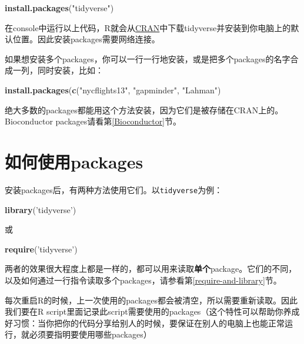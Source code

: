 \documentclass[]{book}
\newenvironment{Shaded}{\begin{snugshade}}{\end{snugshade}}
\newcommand{\KeywordTok}[1]{\textcolor[rgb]{0.13,0.29,0.53}{\textbf{#1}}}
\newcommand{\NormalTok}[1]{#1}
\newcommand{\StringTok}[1]{\textcolor[rgb]{0.31,0.60,0.02}{#1}}
\begin{document}
\begin{Shaded}
\begin{Highlighting}[]
\KeywordTok{install.packages}\NormalTok{(}\StringTok{"tidyverse"}\NormalTok{)}
\end{Highlighting}
\end{Shaded}

在console中运行以上代码，R就会从\href{https://cran.r-project.org}{CRAN}中下载tidyverse并安装到你电脑上的默认位置。因此安装packages需要网络连接。

如果想安装多个packages，你可以一行一行地安装，或是把多个packages的名字合成一列，同时安装，比如：

\begin{Shaded}
\begin{Highlighting}[]
\KeywordTok{install.packages}\NormalTok{(}\KeywordTok{c}\NormalTok{(}\StringTok{"nycflights13"}\NormalTok{, }\StringTok{"gapminder"}\NormalTok{, }\StringTok{"Lahman"}\NormalTok{)}
\end{Highlighting}
\end{Shaded}

绝大多数的packages都能用这个方法安装，因为它们是被存储在CRAN上的。Bioconductor packages请看第\ref{Bioconductor}节。

\hypertarget{packages}{%
\section{如何使用packages}\label{packages}}

安装packages后，有两种方法使用它们。以\texttt{tidyverse}为例：

\begin{Shaded}
\begin{Highlighting}[]
\KeywordTok{library}\NormalTok{(}\StringTok{'tidyverse'}\NormalTok{)}
\end{Highlighting}
\end{Shaded}

或

\begin{Shaded}
\begin{Highlighting}[]
\KeywordTok{require}\NormalTok{(}\StringTok{'tidyverse'}\NormalTok{)}
\end{Highlighting}
\end{Shaded}

两者的效果很大程度上都是一样的，都可以用来读取\textbf{单个}package。它们的不同，以及如何通过一行指令读取多个packages，请参看第\ref{require-and-library}节。

每次重启R的时候，上一次使用的packages都会被清空，所以需要重新读取。因此我们要在R script里面记录此script需要使用的packages（这个特性可以帮助你养成好习惯：当你把你的代码分享给别人的时候，要保证在别人的电脑上也能正常运行，就必须要指明要使用哪些packages）
\end{document}
